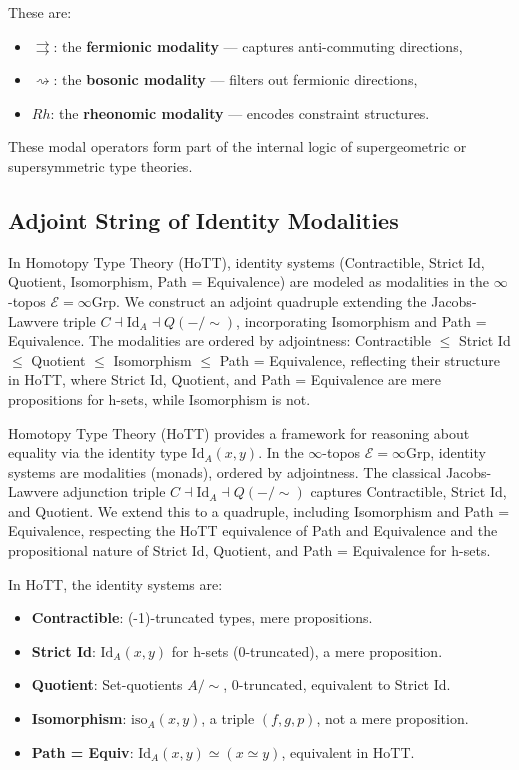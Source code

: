 \documentclass{article}
\begin{document}
These are:
\begin{itemize}
  \item $\rightrightarrows$: the \textbf{fermionic modality} — captures anti-commuting directions,
  \item $\rightsquigarrow$: the \textbf{bosonic modality} — filters out fermionic directions,
  \item $Rh$: the \textbf{rheonomic modality} — encodes constraint structures.
\end{itemize}

These modal operators form part of the internal logic of supergeometric or supersymmetric type theories.

\newpage
\subsection{Adjoint String of Identity Modalities}
In Homotopy Type Theory (HoTT), identity systems (Contractible, Strict Id, Quotient, Isomorphism, Path = Equivalence) are modeled as modalities in the $\infty$-topos $\mathcal{E} = \infty\text{Grp}$. We construct an adjoint quadruple extending the Jacobs-Lawvere triple $C \dashv \text{Id}_A \dashv Q(-/\sim)$, incorporating Isomorphism and Path = Equivalence. The modalities are ordered by adjointness: Contractible $\leq$ Strict Id $\leq$ Quotient $\leq$ Isomorphism $\leq$ Path = Equivalence, reflecting their structure in HoTT, where Strict Id, Quotient, and Path = Equivalence are mere propositions for h-sets, while Isomorphism is not.

Homotopy Type Theory (HoTT) provides a framework for reasoning about equality via the identity type $\text{Id}_A(x,y)$. In the $\infty$-topos $\mathcal{E} = \infty\text{Grp}$, identity systems are modalities (monads), ordered by adjointness. The classical Jacobs-Lawvere adjunction triple $C \dashv \text{Id}_A \dashv Q(-/\sim)$ captures Contractible, Strict Id, and Quotient. We extend this to a quadruple, including Isomorphism and Path = Equivalence, respecting the HoTT equivalence of Path and Equivalence and the propositional nature of Strict Id, Quotient, and Path = Equivalence for h-sets.

\begin{definition}
In HoTT, the identity systems are:
\begin{itemize}
    \item \textbf{Contractible}: (-1)-truncated types, mere propositions.
    \item \textbf{Strict Id}: $\text{Id}_A(x,y)$ for h-sets (0-truncated), a mere proposition.
    \item \textbf{Quotient}: Set-quotients $A / \sim$, 0-truncated, equivalent to Strict Id.
    \item \textbf{Isomorphism}: $\text{iso}_A(x,y)$, a triple $(f, g, p)$, not a mere proposition.
    \item \textbf{Path = Equiv}: $\text{Id}_A(x,y) \simeq (x \simeq y)$, equivalent in HoTT.
\end{itemize}
\end{definition}
\end{document}
